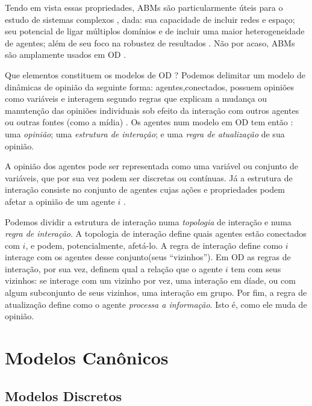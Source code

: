   Tendo em vista essas propriedades, ABMs são particularmente úteis para o
  estudo de sistemas complexos \cite{wilensky2015introduction}, dada: sua
  capacidade de incluir redes e espaço; seu potencial de ligar múltiplos
  domínios e de incluir uma maior heterogeneidade de agentes; além de seu foco
  na robustez de resultados \cite{de2014agent,wilensky2015introduction}. Não por
  acaso, ABMs são amplamente usados em OD  \cite{castellano2012social,flache2017}.

  Que elementos constituem os modelos de OD ? Podemos delimitar um modelo de
  dinâmicas de opinião da seguinte forma: agentes,conectados, possuem opiniões
  como variáveis e interagem segundo regras que explicam a mudança ou manutenção
  das opiniões individuais sob efeito da interação com outros agentes ou outras
  fontes (como a mídia) \cite{sirbu2017opinion}. Os agentes num modelo em OD tem
  então : uma \textit{opinião}; uma \textit{estrutura de interação}; e uma
  \textit{regra de atualização} de sua opinião.


  A opinião dos agentes pode ser representada como uma variável ou conjunto de
  variáveis, que por sua vez podem ser discretas ou contínuas. Já a estrutura de
  interação consiste no conjunto de agentes cujas ações e propriedades podem
  afetar a opinião de um agente \(i\) \cite{page2008uncertainty}.

  Podemos dividir a estrutura de interação numa \textit{topologia} de interação e
  numa \textit{regra de interação}. A topologia de interação define quais
  agentes estão conectados com \(i\), e podem, potencialmente, afetá-lo. A regra
  de interação define como \(i\) interage com os agentes desse conjunto(seus
  ``vizinhos''). Em OD as regras de interação, por sua vez, definem qual a
  relação que o agente \(i\) tem com seus vizinhos: se interage com um vizinho
  por vez, uma interação em díade, ou com algum subconjunto de seus vizinhos,
  uma interação em grupo. Por fim, a regra de atualização define como o agente
  \textit{processa a informação}. Isto é, como ele muda de opinião.

  

  \section{Modelos Canônicos}
  
\subsection{Modelos Discretos}

